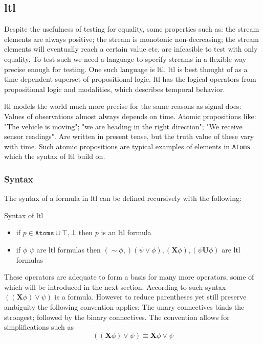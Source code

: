 \subsection{\acrlong{ltl}}
Despite the usefulness of testing for equality, some properties such as: the stream elements are always positive; the stream is monotonic non-decreasing; the stream elements will eventually reach a certain value etc. are infeasible to test with only equality. To test such we need a language to specify streams in a flexible way precise enough for testing. One such language is \acrfull{ltl}.
\acrshort{ltl} is best thought of as a time dependent superset of propositional logic. \acrshort{ltl} has the logical operators from propositional logic and modalities, which describes temporal behavior.

\acrshort{ltl} models the world much more precise for the same reasons as signal does: Values of observations almost always depends on time. Atomic propositions like: "The vehicle is moving"; "we are heading in the right direction"; "We receive sensor readings". Are written in present tense, but the truth value of these vary with time. Such atomic propositions are typical examples of elements in \verb|Atoms| which the syntax of \acrshort{ltl} build on.

\subsubsection{Syntax}
The syntax of a formula in \acrshort{ltl} can be defined recursively with the following:
\begin{definition}
Syntax of \acrshort{ltl}
\label{def:formula}
\begin{itemize}
    \item if $ p \in \texttt{Atoms} \cup {\top, \bot} $ then $p$ is an \acrshort{ltl} formula
    \item if $\phi$ $\psi$ are \acrshort{ltl} formulas then $(\sim \phi,) (\psi \vee \phi), (\mathbf{X} \phi), (\psi \mathbf{U} \phi)$ are \acrshort{ltl} formulas
\end{itemize}
\end{definition}
These operators are adequate to form a basis for many more operators, some of which will be introduced in the next section.
According to such syntax $((\mathbf{X}\phi) \vee \psi)$ is a formula. However to reduce parentheses yet still preserve ambiguity the following convention applies: The unary connectives binds the strongest; followed by the binary connectives. The convention allows for simplifications such as
$$((\mathbf{X}\phi) \vee \psi) \equiv \mathbf{X}\phi \vee \psi$$

